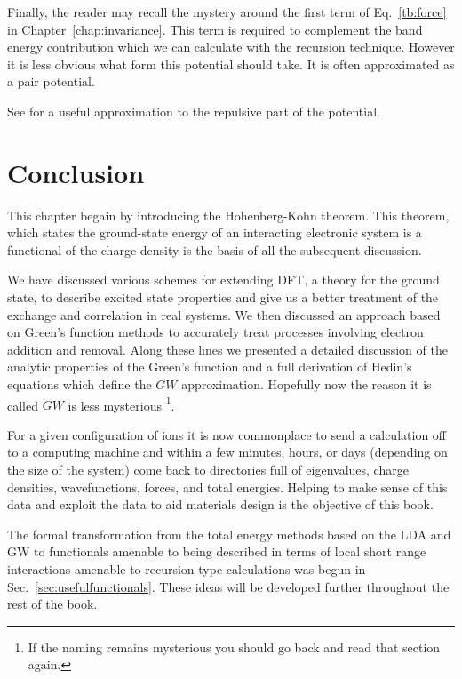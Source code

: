 Finally, the reader may recall the mystery around the first term 
of Eq.~\ref{tb:force} in Chapter~\ref{chap:invariance}. This term is required to complement
the band energy contribution which we can calculate with the recursion technique. However it is
less obvious what form this potential should take. It is often approximated as a pair potential.

See \cite{wolfsberger52} for a useful approximation to the repulsive part of 
the potential.


\section{Conclusion}
\noindent
This chapter begain by introducing the Hohenberg-Kohn theorem. This theorem,
which states the ground-state energy of an interacting electronic system 
is a functional of the charge density is the basis of all the
subsequent discussion. 

We have discussed various schemes for extending DFT, a theory for the ground state,
to describe excited state properties and give us a better treatment of the exchange
and correlation in real systems. We then discussed an approach based on Green's function methods 
to accurately treat processes involving electron addition and removal.
Along these lines we presented a detailed discussion
of the analytic properties of the Green's function and a full derivation of Hedin's
equations which define the $GW$ approximation. Hopefully now the reason it is called
$GW$ is less mysterious \footnote{If the naming remains mysterious you 
should go back and read that section again.}.

For a given configuration of ions it is now commonplace to send a calculation 
off to a computing machine and within a few minutes, hours, or 
days (depending on the size of the system) come back to directories 
full of eigenvalues, charge densities, wavefunctions, forces, and total energies.
Helping to make sense of this data and exploit the data to aid materials design is the 
objective of this book.

The formal transformation from the total energy methods based on the LDA and GW 
to functionals amenable to being described in terms of local short range interactions 
amenable to recursion type calculations was begun in Sec.~\ref{sec:usefulfunctionals}. 
These ideas will be developed further throughout the rest of the book.
